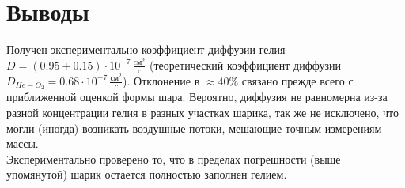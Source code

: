 \documentclass[a4paper,12pt]{article}
\begin{document}
\section{Выводы}
Получен экспериментально коэффициент диффузии гелия $D = (0.95\pm0.15)\cdot10^{-7}\, \frac{cм^2}{с}$
(теоретический коэффициент диффузии $D_{He-O_2}=0.68\cdot10^{-7}\,\frac{см^2}{c}$).
Отклонение в $\approx40\%$ связано прежде всего с приближенной оценкой формы шара. Вероятно, диффузия не равномерна из-за разной концентрации гелия в разных участках шарика, так же не исключено, что могли (иногда) возникать воздушные потоки, мешающие точным измерениям массы.\\
Экспериментально проверено то, что в пределах погрешности (выше упомянутой) шарик остается полностью заполнен гелием.
%
\end{document}
